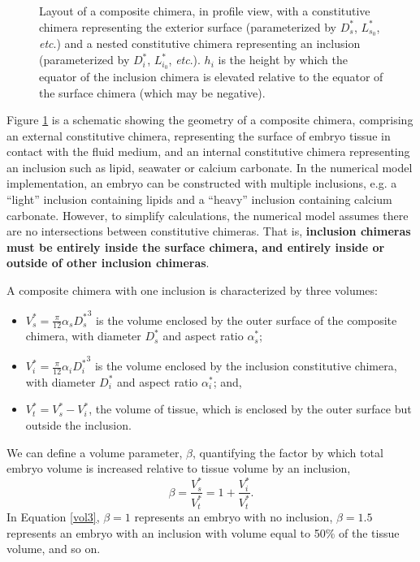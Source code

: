 \documentclass[10pt,a4paper]{article}
\def\etc{\emph{etc}.\xspace}
\begin{document}
\begin{figure}[t]
\begin{center}
{\begin{tikzpicture}
			\end{tikzpicture}
		}
	\end{center}
	\caption{Layout of a composite chimera, in profile view, with a constitutive chimera representing the exterior surface (parameterized by $D_s^*$, $L^*_{s_0}$, \etc) and a nested constitutive chimera representing an inclusion (parameterized by $D_i^*$, $L^*_{i_0}$, \etc). 
	$h_i$ is the height by which the equator of the inclusion chimera is elevated relative to the equator of the surface chimera (which may be negative). 
	} \label{fig:chimera2}
\end{figure}
\noindent
Figure \ref{fig:chimera2} is a schematic showing the geometry of a composite chimera, comprising an external constitutive chimera, representing the surface of embryo tissue in contact with the fluid medium, and an internal constitutive chimera representing an inclusion such as lipid, seawater or calcium carbonate.
In the numerical model implementation, an embryo can be constructed with multiple inclusions, e.g. a ``light'' inclusion containing lipids and a ``heavy'' inclusion containing calcium carbonate.
However, to simplify calculations, the numerical model assumes there are no intersections between constitutive chimeras.
That is, \textbf{inclusion chimeras must be entirely inside the surface chimera, and entirely inside or outside of other inclusion chimeras}.

A composite chimera with one inclusion is characterized by three volumes:
\begin{itemize}
	\item $V_s^* = \frac{\pi}{12} \alpha_s {D_s^*}^3$ is the volume enclosed by the outer surface of the composite chimera, with diameter $D_s^*$ and aspect ratio $\alpha_s^*$;
	\item $V_i^* = \frac{\pi}{12} \alpha_i {D_i^*}^3$ is the volume enclosed by the inclusion constitutive chimera, with diameter $D_i^*$ and aspect ratio $\alpha_i^*$; and,
	\item $V_t^* = V_s^* - V_i^*$, the volume of tissue, which is enclosed by the outer surface but outside the inclusion. 
\end{itemize}
We can define a volume parameter, $\beta$, quantifying the factor by which total embryo volume is increased relative to tissue volume by an inclusion,
\begin{equation}\label{vol3}
	\beta = \frac{V_s^*}{V_t^*} = 1 + \frac{V_i^*}{V_t^*}.
\end{equation}
In Equation \ref{vol3}, $\beta = 1$ represents an embryo with no inclusion, $\beta = 1.5$ represents an embryo with an inclusion with volume equal to 50\% of the tissue volume, and so on.
\end{document}
